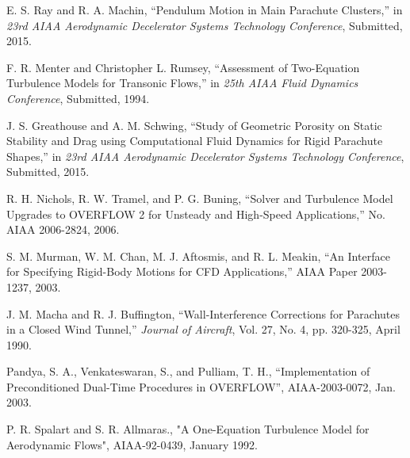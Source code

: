 \documentclass[]{aiaa-tc}%
\begin{document}
\begin{thebibliography}{9}%

 E. S. Ray and R. A. Machin, ``Pendulum Motion in Main Parachute Clusters,'' in {\it 23rd AIAA Aerodynamic Decelerator Systems Technology Conference}, Submitted, 2015.

 F. R. Menter and Christopher L. Rumsey, ``Assessment of Two-Equation Turbulence Models for Transonic Flows,'' in {\it 25th AIAA Fluid Dynamics Conference}, Submitted, 1994.

 J. S. Greathouse and A. M. Schwing, ``Study of Geometric Porosity on Static Stability and Drag using Computational Fluid Dynamics for Rigid Parachute Shapes,'' in {\it 23rd AIAA Aerodynamic Decelerator Systems Technology Conference}, Submitted, 2015.

 R. H. Nichols, R. W. Tramel, and P. G. Buning, “Solver and Turbulence Model Upgrades to OVERFLOW 2 for Unsteady and High-Speed Applications,” No. AIAA 2006-2824, 2006.

 S. M. Murman, W. M. Chan, M. J. Aftosmis, and R. L. Meakin, ``An Interface for Specifying Rigid-Body Motions for CFD Applications,'' AIAA Paper 2003-1237, 2003.

 J. M. Macha and R. J. Buffington, ``Wall-Interference Corrections for Parachutes in a Closed Wind Tunnel,'' {\it Journal of Aircraft}, Vol. 27, No. 4, pp. 320-325, April 1990.

Pandya, S. A., Venkateswaran, S., and Pulliam, T. H., “Implementation of Preconditioned Dual-Time Procedures in
OVERFLOW”, AIAA-2003-0072, Jan. 2003.

P. R. Spalart and S. R. Allmaras., "A One-Equation Turbulence Model for Aerodynamic Flows", AIAA-92-0439, January 1992.


\end{thebibliography}
\end{document}
